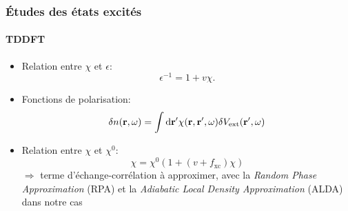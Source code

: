 \documentclass[french]{beamer}
\newcommand{\vb}[1]{\mathbf{#1}}
\newcommand{\V}[1]{\textnormal{#1}}
\newcommand{\dd}[0]{\textrm{d}}
\begin{document}
\begin{frame}
\frametitle{Études des états excités}
\framesubtitle{TDDFT}
\begin{itemize}
\item Relation entre $\chi$ et $\epsilon$:
\begin{equation*}
  \epsilon^{-1} = 1+ v\chi.
\end{equation*}
\item Fonctions de polarisation:
\begin{equation*}
\begin{split}
\delta n(\vb{r}, \omega) &= \int \dd{\vb{r}'} \chi(\vb{r}, \vb{r}', \omega)\delta V_{\V{ext}}(\vb{r}',\omega)\\
\end{split}
\end{equation*}
\item Relation entre $\chi$ et $\chi^0$:
\begin{equation*}
\chi = \chi^0 ( 1 + (v+f_{\textrm{xc}})\chi)
\end{equation*}
$\Longrightarrow$ terme d'échange-corrélation à approximer,  avec la \textit{Random Phase Approximation} (RPA) et la \textit{Adiabatic Local Density Approximation} (ALDA) dans notre cas
\end{itemize}
\end{frame}
\newpage
\end{document}
